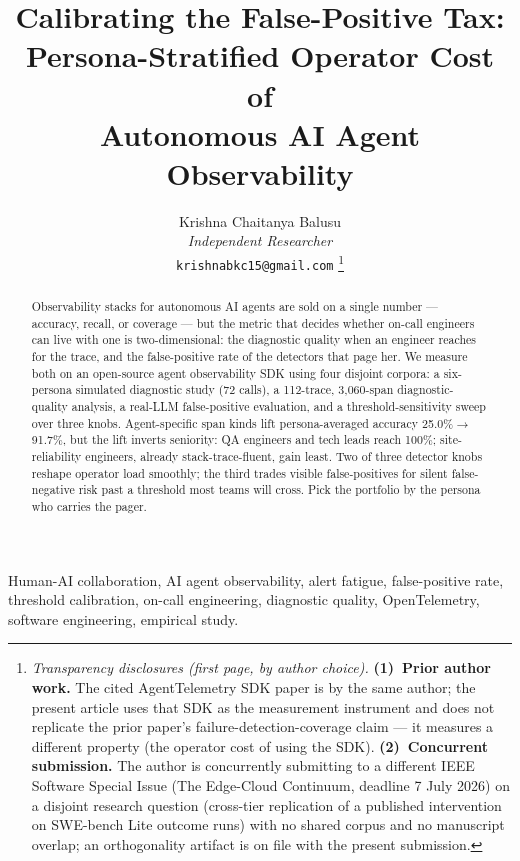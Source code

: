 \documentclass[journal]{IEEEtran}
\title{Calibrating the False-Positive Tax:\\Persona-Stratified Operator Cost of\\Autonomous AI Agent Observability}
\author{
  Krishna Chaitanya Balusu \\
  \textit{Independent Researcher} \\
  \texttt{krishnabkc15@gmail.com}
  \thanks{\emph{Transparency disclosures (first page, by author choice).} \textbf{(1)~Prior author work.} The cited AgentTelemetry SDK paper \cite{aiware2026} is by the same author; the present article uses that SDK as the measurement instrument and does not replicate the prior paper's failure-detection-coverage claim --- it measures a different property (the operator cost of using the SDK). \textbf{(2)~Concurrent submission.} The author is concurrently submitting to a different IEEE Software Special Issue (The Edge-Cloud Continuum, deadline 7 July 2026) on a disjoint research question (cross-tier replication of a published intervention on SWE-bench Lite outcome runs) with no shared corpus and no manuscript overlap; an orthogonality artifact is on file with the present submission.}
}
\begin{document}
\maketitle

\begin{abstract}
Observability stacks for autonomous AI agents are sold on a single number --- accuracy, recall, or coverage --- but the metric that decides whether on-call engineers can live with one is two-dimensional: the diagnostic quality when an engineer reaches for the trace, and the false-positive rate of the detectors that page her. We measure both on an open-source agent observability SDK using four disjoint corpora: a six-persona simulated diagnostic study (72 calls), a 112-trace, 3{,}060-span diagnostic-quality analysis, a real-LLM false-positive evaluation, and a threshold-sensitivity sweep over three knobs. Agent-specific span kinds lift persona-averaged accuracy 25.0\%$\to$91.7\%, but the lift inverts seniority: QA engineers and tech leads reach 100\%; site-reliability engineers, already stack-trace-fluent, gain least. Two of three detector knobs reshape operator load smoothly; the third trades visible false-positives for silent false-negative risk past a threshold most teams will cross. Pick the portfolio by the persona who carries the pager.
\end{abstract}

\begin{IEEEkeywords}
Human-AI collaboration, AI agent observability, alert fatigue, false-positive rate, threshold calibration, on-call engineering, diagnostic quality, OpenTelemetry, software engineering, empirical study.
\end{IEEEkeywords}
\end{document}
